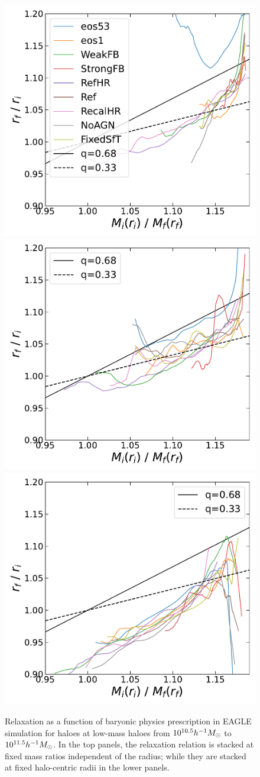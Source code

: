 \begin{figure}[htbp]
\centering
\includegraphics[width=0.32\linewidth]{plots/eagle_physvar_rad_indep_relxn_reln_MiMf_10.5.pdf}
\includegraphics[width=0.32\linewidth]{plots/eagle_physvar_rad_indep_relxn_reln_MiMf_11.pdf}
\includegraphics[width=0.32\linewidth]{plots/eagle_physvar_rad_indep_relxn_reln_MiMf_11.5.pdf}
\caption[]{Relaxation as a function of baryonic physics prescription in EAGLE simulation for haloes at low-mass haloes from $10^{10.5} h^{-1}M_{\odot}$ to $10^{11.5} h^{-1}M_{\odot}$. In the top panels, the relaxation relation is stacked at fixed mass ratios independent of the radius; while they are stacked at fixed halo-centric radii in the lower panels.}
\label{fig:EAGLE-rad-indep}
\end{figure}

